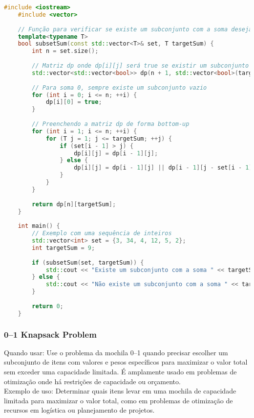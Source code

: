 \documentclass{article}
\begin{document}
\begin{lstlisting}[language=C++, caption=Subset Sum Problem]
    #include <iostream>
    #include <vector>
    
    // Função para verificar se existe um subconjunto com a soma desejada
    template<typename T>
    bool subsetSum(const std::vector<T>& set, T targetSum) {
        int n = set.size();
    
        // Matriz dp onde dp[i][j] será true se existir um subconjunto dos primeiros i elementos com soma j
        std::vector<std::vector<bool>> dp(n + 1, std::vector<bool>(targetSum + 1, false));
    
        // Para soma 0, sempre existe um subconjunto vazio
        for (int i = 0; i <= n; ++i) {
            dp[i][0] = true;
        }
    
        // Preenchendo a matriz dp de forma bottom-up
        for (int i = 1; i <= n; ++i) {
            for (T j = 1; j <= targetSum; ++j) {
                if (set[i - 1] > j) {
                    dp[i][j] = dp[i - 1][j];
                } else {
                    dp[i][j] = dp[i - 1][j] || dp[i - 1][j - set[i - 1]];
                }
            }
        }
    
        return dp[n][targetSum];
    }
    
    int main() {
        // Exemplo com uma sequência de inteiros
        std::vector<int> set = {3, 34, 4, 12, 5, 2};
        int targetSum = 9;
    
        if (subsetSum(set, targetSum)) {
            std::cout << "Existe um subconjunto com a soma " << targetSum << std::endl;
        } else {
            std::cout << "Não existe um subconjunto com a soma " << targetSum << std::endl;
        }
    
        return 0;
    }
\end{lstlisting}

\subsubsection{0–1 Knapsack Problem}

Quando usar: Use o problema da mochila 0–1 quando precisar escolher um subconjunto de itens com valores e pesos específicos para maximizar o valor total sem exceder uma capacidade limitada. É amplamente usado em problemas de otimização onde há restrições de capacidade ou orçamento.
\\Exemplo de uso: Determinar quais itens levar em uma mochila de capacidade limitada para maximizar o valor total, como em problemas de otimização de recursos em logística ou planejamento de projetos.
\end{document}
